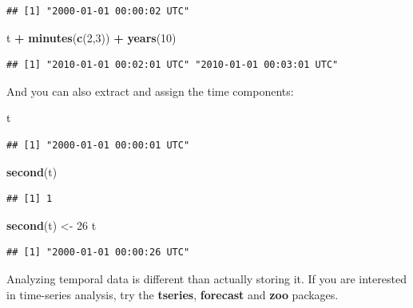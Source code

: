 \documentclass[]{book}
\newenvironment{Shaded}{\begin{snugshade}}{\end{snugshade}}
\newcommand{\KeywordTok}[1]{\textcolor[rgb]{0.13,0.29,0.53}{\textbf{#1}}}
\newcommand{\DecValTok}[1]{\textcolor[rgb]{0.00,0.00,0.81}{#1}}
\newcommand{\StringTok}[1]{\textcolor[rgb]{0.31,0.60,0.02}{#1}}
\newcommand{\OperatorTok}[1]{\textcolor[rgb]{0.81,0.36,0.00}{\textbf{#1}}}
\newcommand{\NormalTok}[1]{#1}
\theoremstyle{definition}
\theoremstyle{definition}
\theoremstyle{definition}
\theoremstyle{remark}
\begin{document}
\begin{verbatim}
## [1] "2000-01-01 00:00:02 UTC"
\end{verbatim}

\begin{Shaded}
\begin{Highlighting}[]
\NormalTok{t }\OperatorTok{+}\StringTok{ }\KeywordTok{minutes}\NormalTok{(}\KeywordTok{c}\NormalTok{(}\DecValTok{2}\NormalTok{,}\DecValTok{3}\NormalTok{)) }\OperatorTok{+}\StringTok{ }\KeywordTok{years}\NormalTok{(}\DecValTok{10}\NormalTok{)}
\end{Highlighting}
\end{Shaded}

\begin{verbatim}
## [1] "2010-01-01 00:02:01 UTC" "2010-01-01 00:03:01 UTC"
\end{verbatim}

And you can also extract and assign the time components:

\begin{Shaded}
\begin{Highlighting}[]
\NormalTok{t}
\end{Highlighting}
\end{Shaded}

\begin{verbatim}
## [1] "2000-01-01 00:00:01 UTC"
\end{verbatim}

\begin{Shaded}
\begin{Highlighting}[]
\KeywordTok{second}\NormalTok{(t)}
\end{Highlighting}
\end{Shaded}

\begin{verbatim}
## [1] 1
\end{verbatim}

\begin{Shaded}
\begin{Highlighting}[]
\KeywordTok{second}\NormalTok{(t) <-}\StringTok{ }\DecValTok{26}
\NormalTok{t}
\end{Highlighting}
\end{Shaded}

\begin{verbatim}
## [1] "2000-01-01 00:00:26 UTC"
\end{verbatim}

Analyzing temporal data is different than actually storing it. If you
are interested in time-series analysis, try the \textbf{tseries},
\textbf{forecast} and \textbf{zoo} packages.
\end{document}
